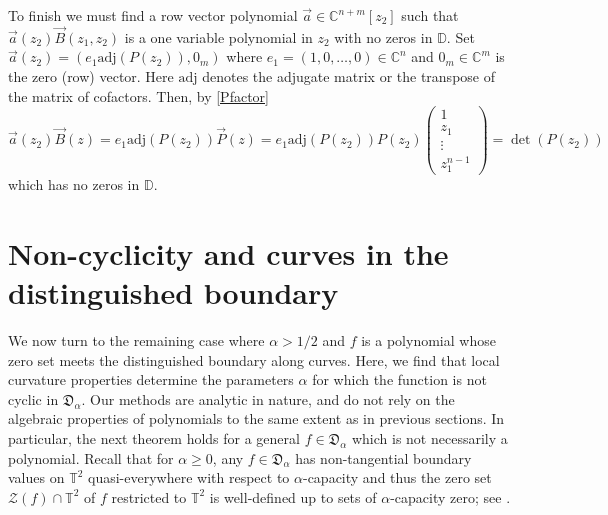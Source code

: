 \documentclass[11 pt,reqno]{amsart}
\theoremstyle{definition}
\theoremstyle{remark}
\numberwithin{equation}{section} \numberwithin{figure}{section}
\begin{document}
To finish we must find a row vector polynomial $\vec{a} \in
{{\mathbb C}}^{n+m}[z_2]$ such that $\vec{a}(z_2) \vec{B}(z_1,z_2)$ is a one variable
polynomial in $z_2$ with no zeros in ${{\mathbb D}}$.  Set $\vec{a}(z_2) = (e_1
\text{adj}(P(z_2)), 0_m)$ where $e_1 = (1,0,\dots,0) \in {{\mathbb C}}^n$ and
$0_m \in {{\mathbb C}}^m$ is the zero (row) vector.  Here $\text{adj}$ denotes
the adjugate matrix or the transpose of the matrix of cofactors.
Then, by \eqref{Pfactor}
\[
\vec{a}(z_2)\vec{B}(z) = e_1 \text{adj}(P(z_2)) \vec{P}(z) = e_1
\text{adj}(P(z_2)) P(z_2) \begin{pmatrix} 1 \\ z_1 \\ \vdots \\
  z_1^{n-1} \end{pmatrix} = \det(P(z_2))
\]
which has no zeros in ${{\mathbb D}}$.

\section{Non-cyclicity and curves in the distinguished boundary}\label{Curves}
We now turn to the remaining case where $\alpha>1/2$ and $f$ is a
polynomial whose zero set meets the distinguished boundary along
curves. Here, we find that local curvature properties determine the
parameters $\alpha$ for which the function is not cyclic in
$\mathfrak{D}_\alpha$. Our methods are analytic in nature, and do not
rely on the algebraic properties of polynomials to the same extent as
in previous sections.  In particular, the next theorem holds for a
general $f \in {\mathfrak{D}_{\alpha}}$ which is not necessarily a polynomial.  Recall
that for ${\alpha} \geq 0$, any $f \in {\mathfrak{D}_{\alpha}}$ has non-tangential boundary
values on ${{\mathbb T}}^2$ quasi-everywhere with respect to ${\alpha}$-capacity and
thus the zero set ${\mathcal{Z}}(f) \cap {{\mathbb T}}^2$ of $f$ restricted to ${{\mathbb T}}^2$ is
well-defined up to sets of ${\alpha}$-capacity zero; see \cite{Kap94}.
\end{document}
